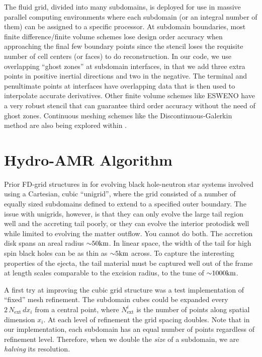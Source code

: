 The fluid grid, divided into many subdomains, is deployed for use in massive parallel computing environments where each subdomain (or an integral number of them) can be assigned to a specific processor. 
At subdomain boundaries, most finite difference/finite volume schemes lose design order accuracy when approaching the final few boundary points since the stencil loses the requisite number of cell centers (or faces) to do reconstruction.
In our code, we use overlapping ``ghost zones'' at subdomain interfaces, in that we add three extra points in positive inertial directions and two in the negative.
The terminal and penultimate points at interfaces have overlapping data that is then used to interpolate accurate derivatives.
Other finite volume schemes like ESWENO have a very robust stencil that can guarantee third order accuracy without the need of ghost zones.  
Continuous meshing schemes like the Discontinuous-Galerkin method are also being explored within \SpEC.



\section{Hydro-AMR Algorithm}
\label{sec:hydro-amr}

Prior FD-grid structures in \SpEC for evolving black hole-neutron star systems involved using a Cartesian, cubic ``unigrid'', where the grid consisted of a number of equally sized subdomains defined to extend to a specified outer boundary.  The issue with unigrids, however, is that they can only evolve the large tail region well and the accreting tail poorly, or they can evolve the interior protodisk well while limited to evolving the matter outflow.  You cannot do both.  The accretion disk spans an areal radius $\mathord{\sim} 50 \textrm{km}$.  In linear space, the width of the tail for high spin black holes can be as thin as $\mathord{\sim} 5 \textrm{km}$ across.  To capture the interesting properties of the ejecta, the tail material must be captured well out of the frame at length scales comparable to the excision radius, to the tune of $\mathord{\sim} 1000 \textrm{km}$.

A first try at improving the cubic grid structure was a test implementation of ``fixed'' mesh refinement.  The subdomain cubes could be expanded every $2\,N_\textrm{ext}\,dx_i$ from a central point, where $N^i_\textrm{ext}$ is the number of points along spatial dimension $x_i$.  At each level of refinement the grid spacing doubles.  Note that in our implementation, each subdomain has an equal number of points regardless of refinement level.  Therefore, when we double the \textit{size} of a subdomain, we are \textit{halving} its resolution.

